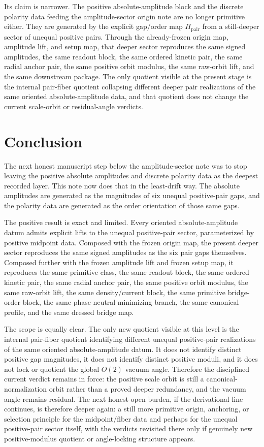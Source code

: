 \documentclass[11pt]{article}
\newcommand{\PairMap}{\Pi_{\mathrm{pair}}}
\begin{document}
Its claim is narrower. The positive absolute-amplitude block and the discrete polarity data feeding the amplitude-sector origin note are no longer primitive either. They are generated by the explicit gap/order map \(\PairMap\) from a still-deeper sector of unequal positive pairs. Through the already-frozen origin map, amplitude lift, and setup map, that deeper sector reproduces the same signed amplitudes, the same readout block, the same ordered kinetic pair, the same radial anchor pair, the same positive orbit modulus, the same raw-orbit lift, and the same downstream package. The only quotient visible at the present stage is the internal pair-fiber quotient collapsing different deeper pair realizations of the same oriented absolute-amplitude data, and that quotient does not change the current scale-orbit or residual-angle verdicts.

\section{Conclusion}

The next honest manuscript step below the amplitude-sector note was to stop leaving the positive absolute amplitudes and discrete polarity data as the deepest recorded layer. This note now does that in the least-drift way. The absolute amplitudes are generated as the magnitudes of six unequal positive-pair gaps, and the polarity data are generated as the order orientation of those same gaps.

The positive result is exact and limited. Every oriented absolute-amplitude datum admits explicit lifts to the unequal positive-pair sector, parameterized by positive midpoint data. Composed with the frozen origin map, the present deeper sector reproduces the same signed amplitudes as the six pair gaps themselves. Composed further with the frozen amplitude lift and frozen setup map, it reproduces the same primitive class, the same readout block, the same ordered kinetic pair, the same radial anchor pair, the same positive orbit modulus, the same raw-orbit lift, the same density/current block, the same primitive bridge-order block, the same phase-neutral minimizing branch, the same canonical profile, and the same dressed bridge map.

The scope is equally clear. The only new quotient visible at this level is the internal pair-fiber quotient identifying different unequal positive-pair realizations of the same oriented absolute-amplitude datum. It does not identify distinct positive gap magnitudes, it does not identify distinct positive moduli, and it does not lock or quotient the global \(O(2)\) vacuum angle. Therefore the disciplined current verdict remains in force: the positive scale orbit is still a canonical-normalization orbit rather than a proved deeper redundancy, and the vacuum angle remains residual. The next honest open burden, if the derivational line continues, is therefore deeper again: a still more primitive origin, anchoring, or selection principle for the midpoint/fiber data and perhaps for the unequal positive-pair sector itself, with the verdicts revisited there only if genuinely new positive-modulus quotient or angle-locking structure appears.
\end{document}
